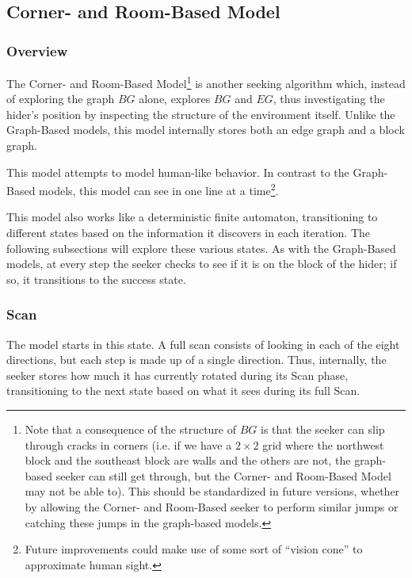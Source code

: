 \documentclass[12pt]{article}
\begin{document}
\subsection{Corner- and Room-Based Model}

\subsubsection{Overview}
The Corner- and Room-Based Model\footnote{Note that a consequence of the structure of $ BG $ is that the seeker can slip through cracks in corners (i.e. if we have a $ 2 \times 2 $ grid where the northwest block and the southeast block are walls and the others are not, the graph-based seeker can still get through, but the Corner- and Room-Based Model may not be able to). This should be standardized in future versions, whether by allowing the Corner- and Room-Based seeker to perform similar jumps or catching these jumps in the graph-based models.} is another seeking algorithm which, instead of exploring the graph $ BG $ alone, explores $ BG $ and $ EG $, thus investigating the hider's position by inspecting the structure of the environment itself. Unlike the Graph-Based models, this model internally stores both an edge graph and a block graph. 

This model attempts to model human-like behavior. In contrast to the Graph-Based models, this model can see in one line at a time\footnote{Future improvements could make use of some sort of ``vision cone'' to approximate human sight.}.

This model also works like a deterministic finite automaton, transitioning to different states based on the information it discovers in each iteration. The following subsections will explore these various states. As with the Graph-Based models, at every step the seeker checks to see if it is on the block of the hider; if so, it transitions to the success state.

\subsubsection{Scan}

The model starts in this state. A full scan consists of looking in each of the eight directions, but each step is made up of a single direction. Thus, internally, the seeker stores how much it has currently rotated during its Scan phase, transitioning to the next state based on what it sees during its full Scan.
\end{document}
